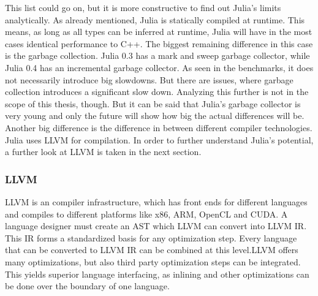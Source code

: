 This list could go on, but it is more constructive to find out Julia's limits analytically.
As already mentioned, Julia is statically compiled at runtime. This means, as long as all types can be inferred at runtime, Julia will have in the most cases identical performance to C++.
The biggest remaining difference in this case is the garbage collection. Julia 0.3 has a mark and sweep garbage collector, while Julia 0.4 has an incremental garbage collector.
As seen in the benchmarks, it does not necessarily introduce big slowdowns.
But there are issues, where garbage collection introduces a significant slow down\cite{ReadDlmGC}.
Analyzing this further is not in the scope of this thesis, though. 
But it can be said that Julia's garbage collector is very young and only the future will show how big the actual differences will be.
Another big difference is the difference in between different compiler technologies.
Julia uses \ac{LLVM} for compilation.
In order to further understand Julia's potential, a further look at LLVM is taken in the next section.

\subsubsection{\ac{LLVM}}

\ac{LLVM} is an compiler infrastructure, which has front ends for different languages and compiles to different platforms like x86, ARM, \ac{OpenCL} and \ac{CUDA}. 
A language designer must create an \ac{AST} which \ac{LLVM} can convert into \ac{LLVM} \ac{IR}. This \ac{IR} forms a standardized basis for any optimization step. Every language that can be converted to \ac{LLVM} \ac{IR} can be combined at this level.\ac{LLVM} offers many optimizations, but also third party optimization steps can be integrated.
This yields superior language interfacing, as inlining and other optimizations can be done over the boundary of one language.

